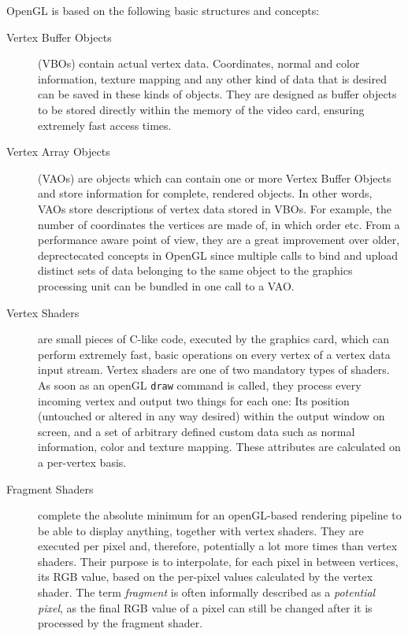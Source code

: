 OpenGL is based on the following basic structures and concepts:

\begin{description}
	\item[Vertex Buffer Objects] (VBOs) contain actual vertex data. Coordinates, normal and color information, texture mapping and any other kind of data that is desired can be saved in these kinds of objects. They are designed as buffer objects to be stored directly within the memory of the video card, ensuring extremely fast access times.
	\item[Vertex Array Objects] (VAOs) are objects which can contain one or more Vertex Buffer Objects and store information for complete, rendered objects. In other words, VAOs store descriptions of vertex data stored in VBOs. For example, the number of coordinates the vertices are made of, in which order etc. From a performance aware point of view, they are a great improvement over older, deprectecated concepts in OpenGL since multiple calls to bind and upload distinct sets of data belonging to the same object to the graphics processing unit can be bundled in one call to a VAO.

	\item[Vertex Shaders] are small pieces of C-like code, executed by the graphics card, which can perform extremely fast, basic operations on every vertex of a vertex data input stream. Vertex shaders are one of two mandatory types of shaders. As soon as an openGL \texttt{draw} command is called, they process every incoming vertex and output two things for each one: Its position (untouched or altered in any way desired) within the output window on screen, and a set of arbitrary defined custom data such as normal information, color and texture mapping. These attributes are calculated on a per-vertex basis.

	\item[Fragment Shaders] complete the absolute minimum for an openGL-based rendering pipeline to be able to display anything, together with vertex shaders. They are executed per pixel and, therefore, potentially a lot more times than vertex shaders. Their purpose is to interpolate, for each pixel in between vertices, its RGB value, based on the per-pixel values calculated by the vertex shader. The term \textit{fragment} is often informally described as a \textit{potential pixel}, as the final RGB value of a pixel can still be changed after it is processed by the fragment shader.

\end{description}

